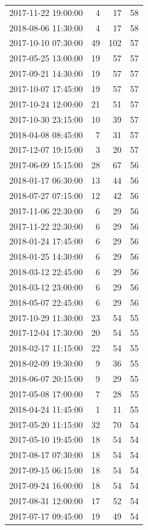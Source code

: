 \begin{tabular}{lrrr}
2017-11-22 19:00:00 & 4 & 17 & 58 \\
2018-08-06 11:30:00 & 4 & 17 & 58 \\
2017-10-10 07:30:00 & 49 & 102 & 57 \\
2017-05-25 13:00:00 & 19 & 57 & 57 \\
2017-09-21 14:30:00 & 19 & 57 & 57 \\
2017-10-07 17:45:00 & 19 & 57 & 57 \\
2017-10-24 12:00:00 & 21 & 51 & 57 \\
2017-10-30 23:15:00 & 10 & 39 & 57 \\
2018-04-08 08:45:00 & 7 & 31 & 57 \\
2017-12-07 19:15:00 & 3 & 20 & 57 \\
2017-06-09 15:15:00 & 28 & 67 & 56 \\
2018-01-17 06:30:00 & 13 & 44 & 56 \\
2018-07-27 07:15:00 & 12 & 42 & 56 \\
2017-11-06 22:30:00 & 6 & 29 & 56 \\
2017-11-22 22:30:00 & 6 & 29 & 56 \\
2018-01-24 17:45:00 & 6 & 29 & 56 \\
2018-01-25 14:30:00 & 6 & 29 & 56 \\
2018-03-12 22:45:00 & 6 & 29 & 56 \\
2018-03-12 23:00:00 & 6 & 29 & 56 \\
2018-05-07 22:45:00 & 6 & 29 & 56 \\
2017-10-29 11:30:00 & 23 & 54 & 55 \\
2017-12-04 17:30:00 & 20 & 54 & 55 \\
2018-02-17 11:15:00 & 22 & 54 & 55 \\
2018-02-09 19:30:00 & 9 & 36 & 55 \\
2018-06-07 20:15:00 & 9 & 29 & 55 \\
2017-05-08 17:00:00 & 7 & 28 & 55 \\
2018-04-24 11:45:00 & 1 & 11 & 55 \\
2017-05-20 11:15:00 & 32 & 70 & 54 \\
2017-05-10 19:45:00 & 18 & 54 & 54 \\
2017-08-17 07:30:00 & 18 & 54 & 54 \\
2017-09-15 06:15:00 & 18 & 54 & 54 \\
2017-09-24 16:00:00 & 18 & 54 & 54 \\
2017-08-31 12:00:00 & 17 & 52 & 54 \\
2017-07-17 09:45:00 & 19 & 49 & 54 \\

\end{tabular}
